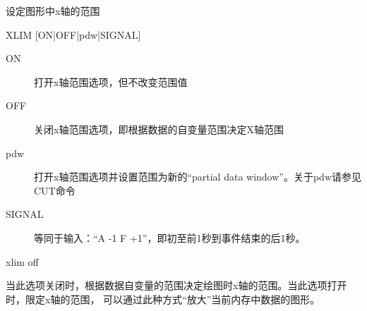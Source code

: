 \label{cmd:xlim}

设定图形中x轴的范围

\begin{SACSTX}
XLIM [ON|OFF|pdw|SIGNAL]
\end{SACSTX}

\begin{description}
\item [ON] 打开x轴范围选项，但不改变范围值
\item [OFF] 关闭x轴范围选项，即根据数据的自变量范围决定X轴范围
\item [pdw] 打开x轴范围选项并设置范围为新的``partial data window''。关于pdw请参见CUT命令
\item [SIGNAL] 等同于输入：``A -1 F +1''，即初至前1秒到事件结束的后1秒。
\end{description}

\begin{SACDFT}
xlim off
\end{SACDFT}

当此选项关闭时，根据数据自变量的范围决定绘图时x轴的范围。当此选项打开时，限定x轴的范围，
可以通过此种方式``放大''当前内存中数据的图形。


